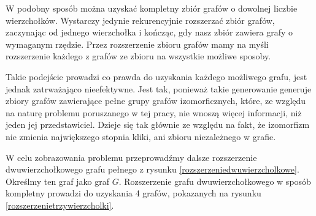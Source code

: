 W podobny sposób można uzyskać kompletny zbiór grafów o dowolnej liczbie wierzchołków. Wystarczy jedynie rekurencyjnie rozszerzać zbiór grafów, zaczynając od jednego wierzchołka i kończąc, gdy nasz zbiór zawiera grafy o wymaganym rzędzie. Przez rozszerzenie zbioru grafów mamy na myśli rozszerzenie każdego z grafów ze zbioru na wszystkie możliwe sposoby. 

Takie podejście prowadzi co prawda  do uzyskania każdego możliwego grafu, jest jednak zatrważająco nieefektywne. Jest tak, ponieważ takie generowanie generuje zbiory grafów zawierające pełne grupy grafów izomorficznych, które, ze względu na naturę problemu poruszanego w tej pracy, nie wnoszą więcej informacji, niż jeden jej przedstawiciel. Dzieje się tak głównie ze względu na fakt, że izomorfizm nie zmienia największego stopnia kliki, ani zbioru niezależnego w grafie.

W celu zobrazowania problemu przeprowadźmy dalsze rozszerzenie dwuwierzchołkowego grafu pełnego z rysunku \ref{rozszerzeniedwuwierzcholkowe}. Określmy ten graf jako graf $G$. Rozszerzenie grafu dwuwierzchołkowego w sposób kompletny prowadzi do uzyskania 4 grafów, pokazanych na rysunku \ref{rozszerzenietrzywierzcholki}.


